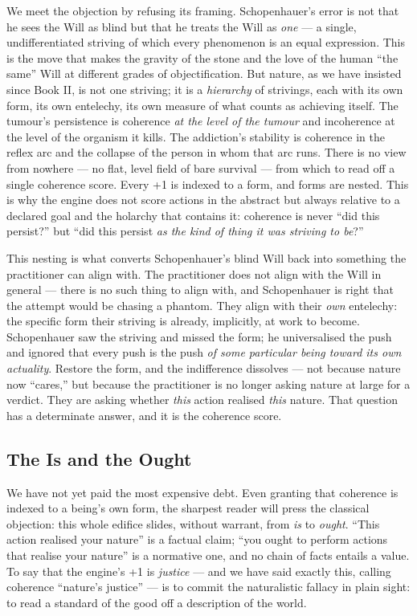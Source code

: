 We meet the objection by refusing its framing. Schopenhauer's error is not that
he sees the Will as blind but that he treats the Will as \emph{one} ---
a single, undifferentiated striving of which every phenomenon is an equal
expression. This is the move that makes the gravity of the stone and the love of
the human ``the same'' Will at different grades of objectification. But nature,
as we have insisted since Book II, is not one striving; it is a \emph{hierarchy}
of strivings, each with its own form, its own entelechy, its own measure of
what counts as achieving itself. The tumour's persistence is coherence
\emph{at the level of the tumour} and incoherence at the level of the organism
it kills. The addiction's stability is coherence in the reflex arc and the
collapse of the person in whom that arc runs. There is no view from nowhere ---
no flat, level field of bare survival --- from which to read off a single
coherence score. Every +1 is indexed to a form, and forms are nested. This is
why the engine does not score actions in the abstract but always relative to a
declared goal and the holarchy that contains it: coherence is never ``did this
persist?'' but ``did this persist \emph{as the kind of thing it was striving to
be}?''

This nesting is what converts Schopenhauer's blind Will back into something the
practitioner can align with. The practitioner does not align with the Will in
general --- there is no such thing to align with, and Schopenhauer is right that
the attempt would be chasing a phantom. They align with their \emph{own}
entelechy: the specific form their striving is already, implicitly, at work to
become. Schopenhauer saw the striving and missed the form; he universalised the
push and ignored that every push is the push \emph{of some particular being
toward its own actuality}. Restore the form, and the indifference dissolves ---
not because nature now ``cares,'' but because the practitioner is no longer
asking nature at large for a verdict. They are asking whether \emph{this} action
realised \emph{this} nature. That question has a determinate answer, and it is
the coherence score.

\subsection{The Is and the Ought}

We have not yet paid the most expensive debt. Even granting that coherence is
indexed to a being's own form, the sharpest reader will press the classical
objection: this whole edifice slides, without warrant, from \emph{is} to
\emph{ought}. ``This action realised your nature'' is a factual claim; ``you
ought to perform actions that realise your nature'' is a normative one, and no
chain of facts entails a value. To say that the engine's +1 is \emph{justice}
--- and we have said exactly this, calling coherence ``nature's justice'' --- is
to commit the naturalistic fallacy in plain sight: to read a standard of the
good off a description of the world.


